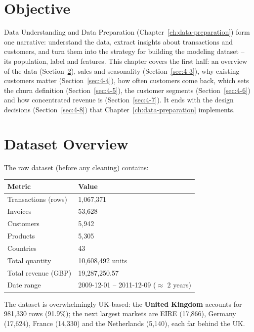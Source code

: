 \section{Objective}
\label{sec:4-1}

Data Understanding and Data Preparation (Chapter~\ref{ch:data-preparation}) form one narrative: understand the data, extract insights about transactions and customers, and turn them into the strategy for building the modeling dataset -- its population, label and features. This chapter covers the first half: an overview of the data (Section~\ref{sec:4-2}), sales and seasonality (Section~\ref{sec:4-3}), why existing customers matter (Section~\ref{sec:4-4}), how often customers come back, which sets the churn definition (Section~\ref{sec:4-5}), the customer segments (Section~\ref{sec:4-6}) and how concentrated revenue is (Section~\ref{sec:4-7}). It ends with the design decisions (Section~\ref{sec:4-8}) that Chapter~\ref{ch:data-preparation} implements.

\section{Dataset Overview}
\label{sec:4-2}

The raw dataset (before any cleaning) contains:

\begin{center}
\begin{tabular}{@{}p{5cm}p{8.5cm}@{}}
    \toprule
    Metric & Value \\
    \midrule
    Transactions (rows) & 1,067,371 \\
    Invoices & 53,628 \\
    Customers & 5,942 \\
    Products & 5,305 \\
    Countries & 43 \\
    Total quantity & 10,608,492 units \\
    Total revenue (GBP) & 19,287,250.57 \\
    Date range & 2009-12-01 -- 2011-12-09 ($\approx$ 2 years) \\
    \bottomrule
\end{tabular}
\end{center}

The dataset is overwhelmingly UK-based: the \textbf{United Kingdom} accounts for 981,330 rows (91.9\%); the next largest markets are EIRE (17,866), Germany (17,624), France (14,330) and the Netherlands (5,140), each far behind the UK.

